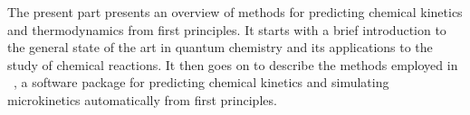 The present part presents an overview of methods for predicting chemical
kinetics and thermodynamics from first principles.
It starts with a brief introduction to the general state of the art in quantum
chemistry and its applications to the study of chemical reactions.
It then goes on to describe the methods employed in
\overreact~\cite{Schneider2022}, a software
package for predicting chemical kinetics and simulating microkinetics
automatically from first principles.





